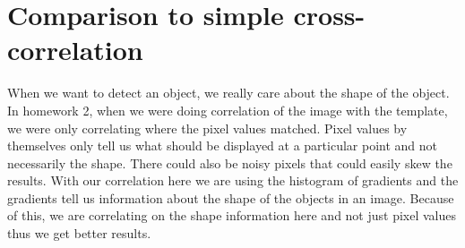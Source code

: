 \documentclass[11pt,psfig]{article}
\begin{document}
\newpage

\section*{Comparison to simple cross-correlation}

When we want to detect an object, we really care about the shape of the object. In homework 2, when we were doing correlation of the image with the template, we were only correlating where the pixel values matched. Pixel values by themselves only tell us what should be displayed at a particular point and not necessarily the shape. There could also be noisy pixels that could easily skew the results. With our correlation here we are using the histogram of gradients and the gradients tell us information about the shape of the objects in an image. Because of this, we are correlating on the shape information here and not just pixel values thus we get better results. 
\end{document}
